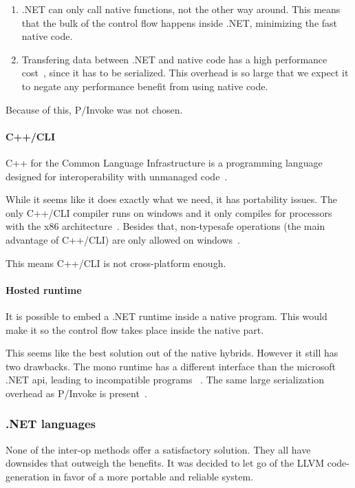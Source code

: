 \begin{enumerate}
    \item .NET can only call native functions, not the other way around.
        This means that the bulk of the control flow happens inside .NET, minimizing the fast native code.
    \item Transfering data between .NET and native code has a high performance cost~\cite{msdn_interop_performance}, since it has to be serialized.
        This overhead is so large that we expect it to negate any performance benefit from using native code.
\end{enumerate}

Because of this, P/Invoke was not chosen.

\paragraph{C++/CLI}
C++ for the Common Language Infrastructure is a programming language designed for interoperability with unmanaged code~\cite{msdn_c++cli}.

While it seems like it does exactly what we need, it has portability issues.
The only C++/CLI compiler runs on windows and it only compiles for processors with the x86 architecture~\cite{mono_c++cli}.
Besides that, non-typesafe operations (the main advantage of C++/CLI) are only allowed on windows~\cite{mono_c++cli}.

This means C++/CLI is not cross-platform enough.

\paragraph{Hosted runtime}
It is possible to embed a .NET runtime inside a native program.
This would make it so the control flow takes place inside the native part.

This seems like the best solution out of the native hybrids.
However it still has two drawbacks.
The mono runtime has a different interface than the microsoft .NET api, leading to incompatible programs ~\cite{mono_embedding}.
The same large serialization overhead as P/Invoke is present~\cite{msdn_hosted}.

\subsubsection{.NET languages}
None of the inter-op methods offer a satisfactory solution.
They all have downsides that outweigh the benefits.
It was decided to let go of the LLVM code-generation in favor of a more portable and reliable system.


